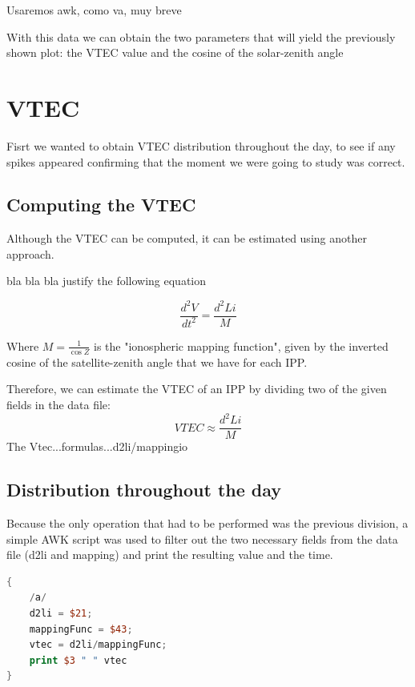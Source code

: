 Usaremos awk, como va, muy breve




With this data we can obtain the two parameters that will yield the previously shown plot: the VTEC value and the cosine of the solar-zenith angle

\section{VTEC}

Fisrt we wanted to obtain VTEC distribution throughout the day, to see if any spikes appeared confirming that the moment we were going to study was correct.

\subsection{Computing the VTEC}

Although the VTEC can be computed, it can be estimated using another approach.

bla bla bla justify the following equation

\begin{equation} \label{eq:1}
	\frac{d^{2}V}{dt^{2}} = \frac{d^{2}Li}{M}
\end{equation}

Where $M=\frac{1}{\cos Z}$ is the "ionospheric mapping function", given by the inverted cosine of the satellite-zenith angle that we have for each IPP. \cite{hernandez2012gnss}

Therefore, we can estimate the VTEC of an IPP by dividing two of the given fields in the data file:
\begin{equation} \label{eq:2}
	VTEC \approx \frac{d^{2}Li}{M}
\end{equation}
The Vtec...formulas...d2li/mappingio


\subsection{Distribution throughout the day}

Because the only operation that had to be performed was the previous division, a simple AWK script was used to filter out the two necessary fields from the data file (d2li and  mapping) and print the resulting value and the time. 

\begin{lstlisting}[language=Awk, caption=process]
{
	/a/
	d2li = $21;
	mappingFunc = $43;
	vtec = d2li/mappingFunc;
	print $3 " " vtec
}
\end{lstlisting}

